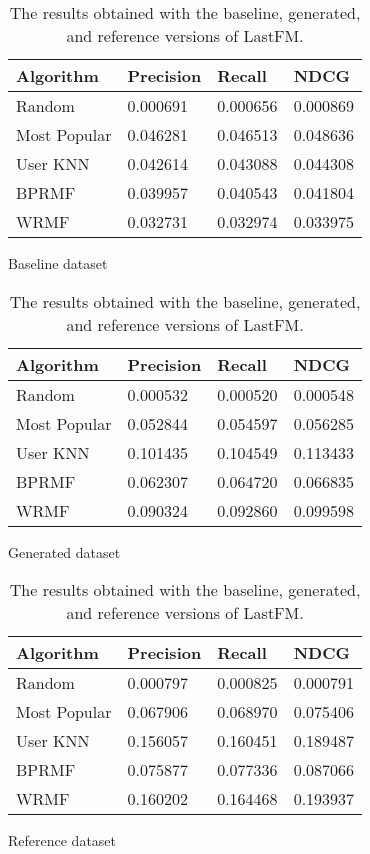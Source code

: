 \begin{table}
\begin{subfigure}{\textwidth}
\centering
\begin{tabular}{@{}llll@{}}
\toprule
Algorithm & Precision & Recall & NDCG \\ \midrule
Random & 0.000691 & 0.000656 & 0.000869 \\
Most Popular & 0.046281 & 0.046513 & 0.048636 \\
User KNN & 0.042614 & 0.043088 & 0.044308 \\
BPRMF & 0.039957 & 0.040543 & 0.041804 \\
WRMF & 0.032731 & 0.032974 & 0.033975 \\ \bottomrule
\end{tabular}
\caption{Baseline dataset}
\bigskip
\end{subfigure}
\begin{subfigure}{\textwidth}
\centering
\begin{tabular}{@{}llll@{}}
\toprule
Algorithm & Precision & Recall & NDCG \\ \midrule
Random & 0.000532 & 0.000520 & 0.000548 \\
Most Popular & 0.052844 & 0.054597 & 0.056285 \\
User KNN & 0.101435 & 0.104549 & 0.113433 \\
BPRMF & 0.062307 & 0.064720 & 0.066835 \\
WRMF & 0.090324 & 0.092860 & 0.099598 \\ \bottomrule
\end{tabular}
\caption{Generated dataset}
\bigskip
\end{subfigure}
\begin{subfigure}{\textwidth}
\centering
\begin{tabular}{@{}llll@{}}
\toprule
Algorithm & Precision & Recall & NDCG \\ \midrule
Random & 0.000797 & 0.000825 & 0.000791 \\
Most Popular & 0.067906 & 0.068970 & 0.075406 \\
User KNN & 0.156057 & 0.160451 & 0.189487 \\
BPRMF & 0.075877 & 0.077336 & 0.087066 \\
WRMF & 0.160202 & 0.164468 & 0.193937 \\ \bottomrule
\end{tabular}
\caption{Reference dataset}
\end{subfigure}
\caption[Experimental results with the synthetic LastFM]{The results obtained with the baseline, generated, and reference versions of LastFM.}
\label{syn:tab:lastfm}
\end{table}


